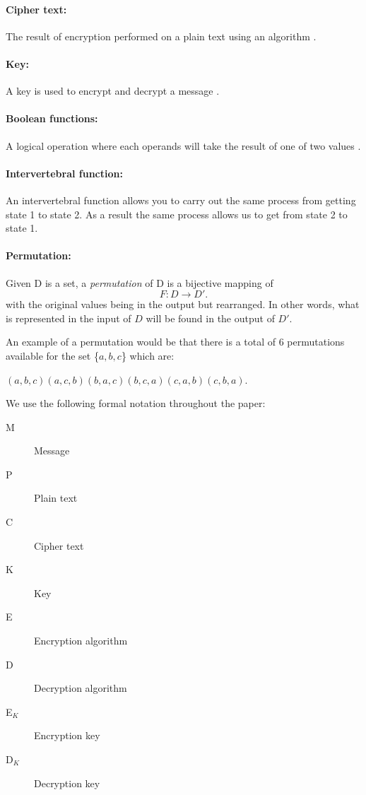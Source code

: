 \documentclass[11pt,a4paper, notitlepage]{report}
\begin{document}
\paragraph{Cipher text:}
The result of encryption performed on a plain text using an algorithm \cite{Berti2003CISSP}.

\paragraph{Key:}
A key is used to encrypt and decrypt a message \cite{Berti2003CISSP}.

\paragraph{Boolean functions:}
A logical operation where each operands will take the result of one of two values \cite{Gregory2013Cryptanalysis}.

\paragraph{Intervertebral function:}
An intervertebral function allows you to carry out the
same process from getting state 1 to state 2. As a result the same process
allows us to get from state 2 to state 1.

\paragraph{Permutation:}
Given D is a set, a \emph{permutation} of D is a bijective mapping of
\begin{displaymath}
F: D \rightarrow D'.
\end{displaymath}
with the original values being in the output but rearranged. In other words, what is represented in the input of $D$ will be found in the output of $D'$.

An example of a permutation would be that there is a total of 6 permutations available for the set \{$a,b,c$\} which are:
\begin{center}
$(a,b,c) (a,c,b) (b,a,c) (b,c,a) (c,a,b) (c,b,a).$
\end{center}


We use the following formal notation throughout the paper:
\begin{description}
\item[M] Message
\item[P] Plain text
\item[C] Cipher text
\item[K] Key
\item[E] Encryption algorithm
\item[D] Decryption algorithm
\item[E$_{K}$] Encryption key
\item[D$_{K}$] Decryption key
\end{description}
\end{document}
